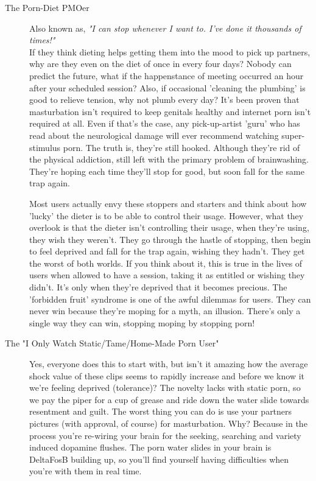 \documentclass[easypeasy]{subfiles}
\begin{document}
\begin{description}
    \item [The Porn-Diet PMOer] Also known as, \textit{"I can stop whenever I want to. I've done it thousands of times!"} \\ If they think dieting helps getting them into the mood to pick up partners, why are they even on the diet of once in every four days? Nobody can predict the future, what if the happenstance of meeting occurred an hour after your scheduled session? Also, if occasional 'cleaning the plumbing' is good to relieve tension, why not plumb every day? It's been proven that masturbation isn't required to keep genitals healthy and internet porn isn't required at all. Even if that's the case, any pick-up-artist 'guru' who has read about the neurological damage will ever recommend watching super-stimulus porn. The truth is, they're still hooked. Although they're rid of the physical addiction, still left with the primary problem of brainwashing. They're hoping each time they'll stop for good, but soon fall for the same trap again.

  Most users actually envy these stoppers and starters and think about how 'lucky' the dieter is to be able to control their usage. However, what they overlook is that the dieter isn't controlling their usage, when they're using, they wish they weren't. They go through the hastle of stopping, then begin to feel deprived and fall for the trap again, wishing they hadn't. They get the worst of both worlds. If you think about it, this is true in the lives of users when allowed to have a session, taking it as entitled or wishing they didn't. It's only when they're deprived that it becomes precious. The 'forbidden fruit' syndrome is one of the awful dilemmas for users. They can never win because they're moping for a myth, an illusion. There's only a single way they can win, stopping moping by stopping porn!

\item [The "I Only Watch Static/Tame/Home-Made Porn User"] Yes, everyone does this to start with, but isn't it amazing how the average shock value of these clips seems to rapidly increase and before we know it we're feeling deprived (tolerance)? The novelty lacks with static porn, so we pay the piper for a cup of grease and ride down the water slide towards resentment and guilt. The worst thing you can do is use your partners pictures (with approval, of course) for masturbation. Why? Because in the process you're re-wiring your brain for the seeking, searching and variety induced dopamine flushes. The porn water slides in your brain is DeltaFosB building up, so you'll find yourself having difficulties when you're with them in real time.


\end{description}
\end{document}
